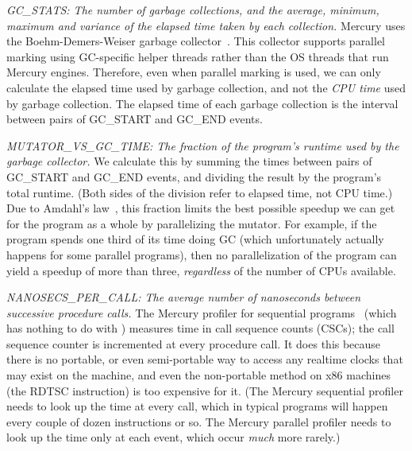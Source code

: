 
\emph{GC\_STATS: The number of garbage collections,
and the average, minimum, maximum and variance
of the elapsed time taken by each collection.}
Mercury uses the Boehm-Demers-Weiser garbage collector~\cite{boehm:1988:gc}.
This collector supports parallel marking using GC-specific helper threads
rather than the OS threads that run Mercury engines.
Therefore, even when parallel marking is used,
we can only calculate the elapsed time used by garbage collection,
and not the \emph{CPU time} used by garbage collection.
The elapsed time of each garbage collection
is the interval between pairs of GC\_START and GC\_END events.

\emph{MUTATOR\_VS\_GC\_TIME:
The fraction of the program's runtime used by the garbage collector.}
We calculate this by summing the times
between pairs of GC\_START and GC\_END events,
and dividing the result by the program's total runtime.
(Both sides of the division refer to elapsed time, not CPU time.)
Due to Amdahl's law~\cite{amdahl:1967:law},
this fraction limits the best possible speedup we can get
for the program as a whole by parallelizing the mutator.
For example, if the program spends one third of its time doing GC
(which unfortunately actually happens for some parallel programs),
then no parallelization of the program can yield a speedup of more than three,
\emph{regardless} of the number of CPUs available.

\emph{NANOSECS\_PER\_CALL:
The average number of nanoseconds between successive procedure calls.}
The Mercury profiler for sequential programs~\cite{conway:2001:mercury-deep}
(which has nothing to do with \tscope)
measures time in call sequence counts (CSCs);
the call sequence counter is incremented at every procedure call.
It does this because there is no portable, or even semi-portable way
to access any realtime clocks that may exist on the machine,
and even the non-portable method on x86 machines (the RDTSC instruction)
is too expensive for it.
(The Mercury sequential profiler needs to look up the time at every call,
which in typical programs will happen every couple of dozen instructions or so.
The Mercury parallel profiler needs to look up the time only at each event,
which occur \emph{much} more rarely.)

